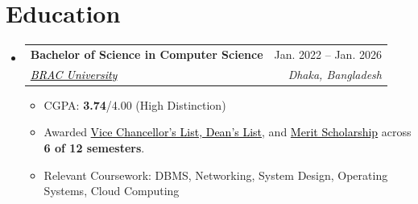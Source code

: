 \documentclass[a4paper]{article}
\makeatletter
\newcommand{\resumeItem}[1]{
  \item\small{
    {#1 \vspace{-2pt}}
  }
}
\newcommand{\resumeSubheading}[4]{
  \vspace{-2pt}\item
    \begin{tabular*}{0.97\textwidth}[t]{l@{\extracolsep{\fill}}r}
      \textbf{#1} & #2 \\
      \textit{\small#3} & \textit{\small #4} \\
    \end{tabular*}\vspace{-7pt}
}
\newcommand{\resumeSubHeadingListStart}{\begin{itemize}[leftmargin=0.15in, label={}]}
\newcommand{\resumeSubHeadingListEnd}{\end{itemize}}
\newcommand{\resumeItemListStart}{\begin{itemize}}
\newcommand{\resumeItemListEnd}{\end{itemize}\vspace{-5pt}}
\makeatother
\begin{document}
\section{Education}
  \resumeSubHeadingListStart
    \resumeSubheading
      {\textbf{Bachelor of Science in Computer Science}}{Jan. 2022 -- Jan. 2026}
{\href{https://www.bracu.ac.bd/}{\textcolor{black}{BRAC University}}}{Dhaka, Bangladesh}
      \resumeItemListStart
        \resumeItem{CGPA: \textbf{3.74}/4.00 (High Distinction)}
        \resumeItem{Awarded \href{https://www.bracu.ac.bd/academics/policies-and-procedures/academic-standings-and-honors}{\textcolor{black}{Vice Chancellor's List, Dean's List}}, and \href{https://www.bracu.ac.bd/admissions/international-applicants/scholarship-financial-aid}{\textcolor{black}{Merit Scholarship}} across \textbf{6 of 12 semesters}.}
        \resumeItem{Relevant Coursework: DBMS, Networking, System Design, Operating Systems, Cloud Computing}
      \resumeItemListEnd
  \resumeSubHeadingListEnd




\end{document}
